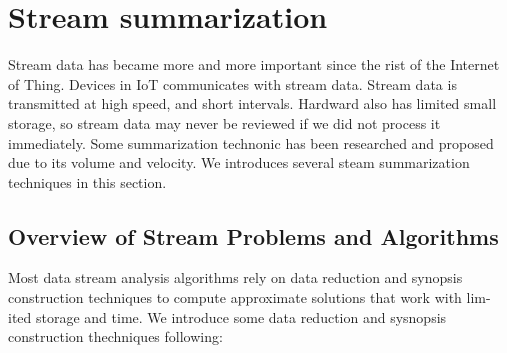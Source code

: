 \section{Stream summarization}

Stream data has became more and more important since the rist of the Internet of
Thing. Devices in IoT communicates with stream data. Stream data is transmitted
at high speed, and short intervals. Hardward also has limited small storage, so
stream data may never be reviewed if we did not process it immediately. Some
summarization technonic has been researched and proposed due to its volume and
velocity. We introduces several steam summarization techniques in this section.

\subsection{Overview of Stream Problems and Algorithms}
Most data stream analysis algorithms rely on data reduction and synopsis
construction techniques to compute approximate solutions that work with lim-ited
storage and time. We introduce some data reduction and sysnopsis construction
thechniques following:
